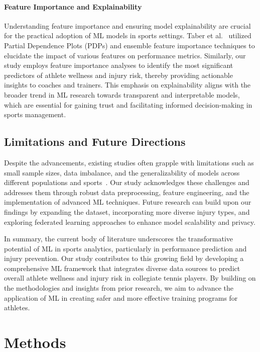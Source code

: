 \documentclass[manuscript,acmsmall,review,screen,authorversion=true]{acmart}
\begin{document}
\paragraph{Feature Importance and Explainability}
Understanding feature importance and ensuring model explainability are crucial for the practical adoption of ML models in sports settings. Taber et al.~\cite{taber2024} utilized Partial Dependence Plots (PDPs) and ensemble feature importance techniques to elucidate the impact of various features on performance metrics. Similarly, our study employs feature importance analyses to identify the most significant predictors of athlete wellness and injury risk, thereby providing actionable insights to coaches and trainers. This emphasis on explainability aligns with the broader trend in ML research towards transparent and interpretable models, which are essential for gaining trust and facilitating informed decision-making in sports management.

\subsection{Limitations and Future Directions}
Despite the advancements, existing studies often grapple with limitations such as small sample sizes, data imbalance, and the generalizability of models across different populations and sports~\cite{taber2024, zhao2022}. Our study acknowledges these challenges and addresses them through robust data preprocessing, feature engineering, and the implementation of advanced ML techniques. Future research can build upon our findings by expanding the dataset, incorporating more diverse injury types, and exploring federated learning approaches to enhance model scalability and privacy.

In summary, the current body of literature underscores the transformative potential of ML in sports analytics, particularly in performance prediction and injury prevention. Our study contributes to this growing field by developing a comprehensive ML framework that integrates diverse data sources to predict overall athlete wellness and injury risk in collegiate tennis players. By building on the methodologies and insights from prior research, we aim to advance the application of ML in creating safer and more effective training programs for athletes.



\section{Methods}
\end{document}
